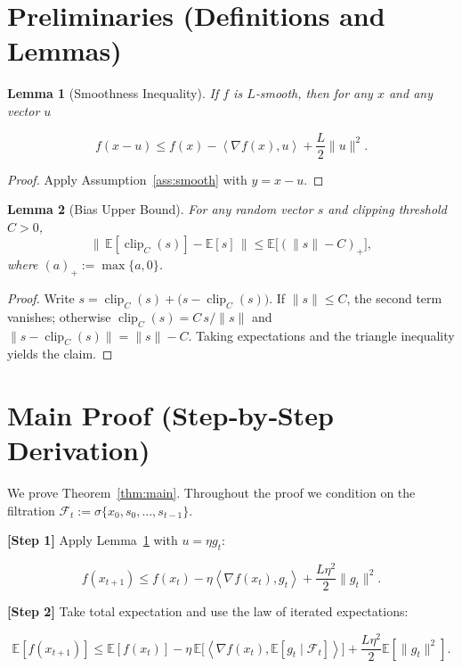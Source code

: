 \documentclass{article}
\newtheorem{lemma}{Lemma}
\newcommand{\E}{\mathbb{E}}
\newcommand{\ip}[2]{\left\langle #1,#2\right\rangle}
\begin{document}
\section*{Preliminaries (Definitions and Lemmas)}
\begin{lemma}[Smoothness Inequality]\label{lem:smooth}
If $f$ is $L$‑smooth, then for any $x$ and any vector $u$  

\[
f(x-u)\le f(x)-\ip{\nabla f(x)}{u}+\frac{L}{2}\|u\|^{2}.
\]
\end{lemma}
\begin{proof}
Apply Assumption~\ref{ass:smooth} with $y=x-u$.
\end{proof}

\begin{lemma}[Bias Upper Bound]\label{lem:bias}
For any random vector $s$ and clipping threshold $C>0$,
\[
\bigl\|\,\E[\operatorname{clip}_{C}(s)]-\E[s]\,\bigr\|
\le \E\!\bigl[(\|s\|-C)_{+}\bigr],
\]
where $(a)_{+}:=\max\{a,0\}$.
\end{lemma}
\begin{proof}
Write $s=\operatorname{clip}_{C}(s)+\bigl(s-\operatorname{clip}_{C}(s)\bigr)$.
If $\|s\|\le C$, the second term vanishes; otherwise
$\operatorname{clip}_{C}(s)=C\,s/\|s\|$ and
$\|s-\operatorname{clip}_{C}(s)\|=\|s\|-C$.
Taking expectations and the triangle inequality yields the claim.
\end{proof}

\section*{Main Proof (Step‑by‑Step Derivation)}
We prove Theorem~\ref{thm:main}. Throughout the proof we condition on the
filtration $\mathcal{F}_{t}:=\sigma\{x_{0},s_{0},\dots,s_{t-1}\}$.

\noindent\textbf{[Step 1]} Apply Lemma~\ref{lem:smooth} with $u=\eta g_{t}$:

\[
f(x_{t+1})\le f(x_{t})-\eta\ip{\nabla f(x_{t})}{g_{t}}
+\frac{L\eta^{2}}{2}\|g_{t}\|^{2}. \tag{4}
\]

\noindent\textbf{[Step 2]} Take total expectation and use the law of
iterated expectations:

\[
\E[f(x_{t+1})]\le \E[f(x_{t})]
-\eta\,\E\!\bigl[\ip{\nabla f(x_{t})}{\E[g_{t}\mid\mathcal{F}_{t}]}\bigr]
+\frac{L\eta^{2}}{2}\E[\|g_{t}\|^{2}]. \tag{5}
\]
\end{document}
